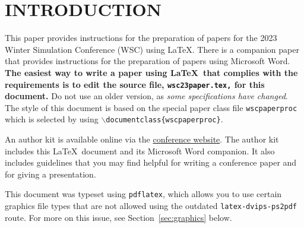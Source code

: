\documentclass{wscpaperproc}
\theoremstyle{wsc}
\begin{document}
\section{INTRODUCTION}
\label{sec:intro}

This paper provides instructions for the preparation of papers for the 2023
Winter Simulation Conference (WSC) using \LaTeX. There is a companion paper that
provides instructions for the preparation of papers using Microsoft Word. \textbf{The easiest way to write a paper using \LaTeX\ that complies with the
requirements is to edit the source file, {\tt wsc23paper.tex,} for this document.} 
Do not use an older version, as \textit{some specifications have changed}.
The style of this document is based on the special paper class file {\tt wscpaperproc} which is selected by using {\tt $\backslash$documentclass\{wscpaperproc\}}.

An author kit is available online via the \href{http://www.wintersim.org}%
{conference website}.
The author kit includes this \LaTeX\ document and its Microsoft Word companion.
It also includes guidelines that you may find helpful for writing a conference paper and for giving a presentation.

This document was typeset using {\tt pdflatex}, which allows you to use certain
graphics file types that are not allowed using the outdated {\tt latex-dvips-ps2pdf} route.
For more on this issue, see Section~\ref{sec:graphics} below.
\end{document}
